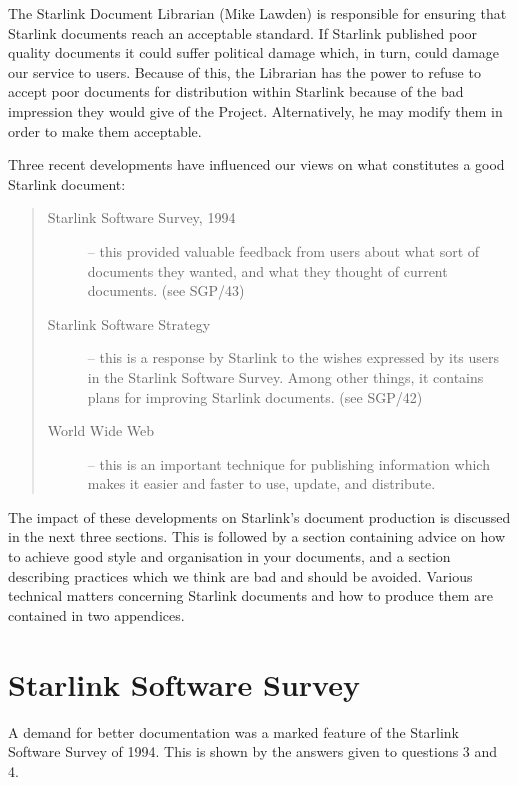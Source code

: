 \documentclass[twoside,11pt]{article}
\newcommand{\xref}[3]{#1}
\begin{document}
The Starlink Document Librarian (Mike Lawden) is responsible for ensuring that
Starlink documents reach an acceptable standard.
If Starlink published poor quality documents it could suffer political damage
which, in turn, could damage our service to users.
Because of this, the Librarian has the power to refuse to accept poor
documents for distribution within Starlink because of the bad impression they
would give of the Project.
Alternatively, he may modify them in order to make them acceptable.

Three recent developments have influenced our views on what constitutes a good
Starlink document:

\begin{quote}
\begin{description}

\item [Starlink Software Survey, 1994] -- this provided valuable feedback
from users about what sort of documents they wanted, and what they thought
of current documents. (see SGP/43)

\item [Starlink Software Strategy] -- this is a response by Starlink to the
wishes expressed by its users in the Starlink Software Survey.
Among other things, it contains plans for improving Starlink documents.
(see \xref{SGP/42}{sgp42}{})

\item [World Wide Web] -- this is an important technique for publishing
information which makes it easier and faster to use, update, and distribute.

\end{description}
\end{quote}

The impact of these developments on Starlink's document production is discussed
in the next three sections.
This is followed by a section containing advice on how to achieve good style and
organisation in your documents, and a section describing practices which
we think are bad and should be avoided.
Various technical matters concerning Starlink documents and how to produce
them are contained in two appendices.

\section{Starlink Software Survey}

A demand for better documentation was a marked feature of the Starlink
Software Survey of 1994.
This is shown by the answers given to questions 3 and 4.
\end{document}
